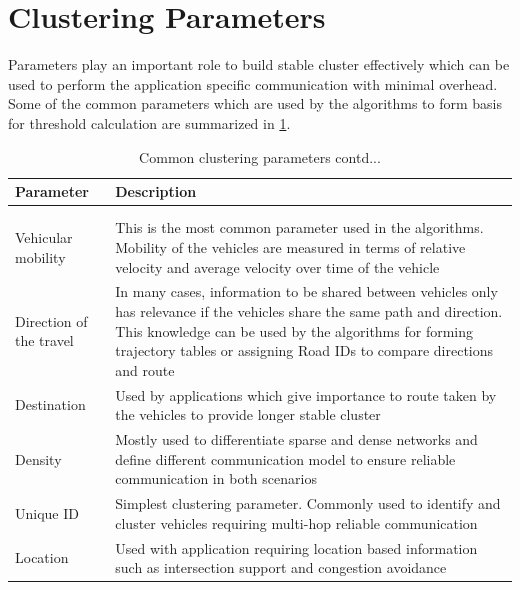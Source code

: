 \documentclass[]{ccs-thesis}
\begin{document}
\section{Clustering Parameters}

Parameters play an important role to build stable cluster effectively which can be used to perform the application
specific communication with minimal overhead. Some of the common parameters which are used by the algorithms to
form basis for threshold calculation are summarized in \cref{tab:parameters}.

\begin{longtable}{>{\raggedright}p{3.5cm}p{7.5cm}}
    \hline
    Parameter               & Description                                                                                                          \\
    \hline
    \endhead
    \hline
    \caption{Common clustering parameters}\label{tab:parameters}                                                                                   \\
    \endfoot
    \hline
    \caption{Common clustering parameters contd...}                                                                                                \\
    \endlastfoot
    Vehicular mobility      & This is the most common parameter used in the algorithms. Mobility of the vehicles are measured in terms of
    relative velocity and average velocity over time of the vehicle                                                                                \\
    Direction of the travel & In many cases, information to be shared between vehicles only has relevance if the vehicles share the same path
    and direction. This knowledge can be used by the algorithms for forming trajectory tables or assigning Road IDs
    to compare directions and route                                                                                                                \\
    Destination             & Used by applications which give importance to route taken by the vehicles to provide longer stable cluster            \\
    Density                 & Mostly used to differentiate sparse and dense networks and define different communication model to ensure reliable
    communication in both scenarios                                                                                                                \\
    Unique ID               & Simplest clustering parameter. Commonly used to identify and cluster vehicles requiring multi-hop reliable communication \\
    Location                & Used with application requiring location based information such as intersection support and congestion avoidance     \\
\end{longtable}
\end{document}
